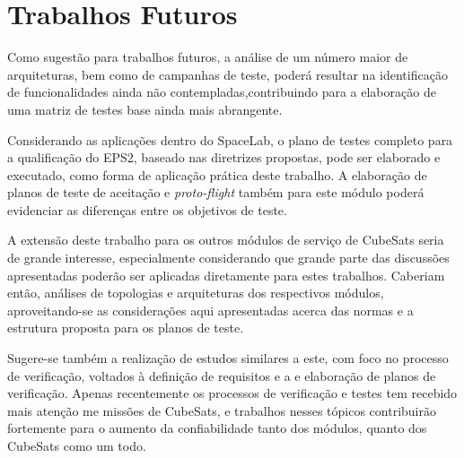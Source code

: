 \section{Trabalhos Futuros}

Como sugestão para trabalhos futuros, a análise de um número maior de arquiteturas, bem como de campanhas de teste, poderá resultar na identificação de funcionalidades ainda não contempladas,contribuindo para a elaboração de uma matriz de testes base ainda mais abrangente.

Considerando as aplicações dentro do SpaceLab, o plano de testes completo para a qualificação do \gls{EPS2}, baseado nas diretrizes propostas, pode ser elaborado e executado, como forma de aplicação prática deste trabalho.
A elaboração de planos de teste de aceitação e \textit{proto-flight} também para este módulo poderá evidenciar as diferenças entre os objetivos de teste.

A extensão deste trabalho para os outros módulos de serviço de CubeSats seria de grande interesse, especialmente considerando que grande parte das discussões apresentadas poderão ser aplicadas diretamente para estes trabalhos.
Caberiam então, análises de topologias e arquiteturas dos respectivos módulos, aproveitando-se as considerações aqui apresentadas acerca das normas e a estrutura proposta para os planos de teste.

Sugere-se também a realização de estudos similares a este, com foco no processo de verificação, voltados à definição de requisitos e a e elaboração de planos de verificação. Apenas recentemente os processos de verificação e testes tem recebido mais atenção me missões de CubeSats, e trabalhos nesses tópicos contribuirão fortemente para o aumento da confiabilidade tanto dos módulos, quanto dos CubeSats como um todo.

